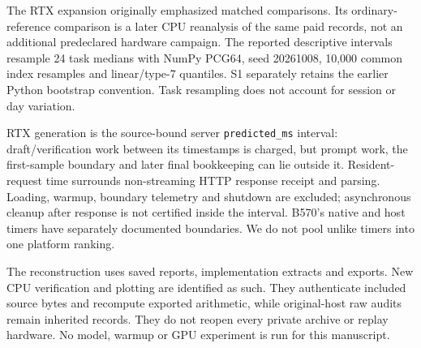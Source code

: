 The RTX expansion originally emphasized matched comparisons. Its ordinary-reference comparison is a later CPU reanalysis of the same paid records, not an additional predeclared hardware campaign. The reported descriptive intervals resample 24 task medians with NumPy PCG64, seed 20261008, 10,000 common index resamples and linear/type-7 quantiles. S1 separately retains the earlier Python bootstrap convention. Task resampling does not account for session or day variation.

RTX generation is the source-bound server \texttt{predicted\_ms} interval: draft/verification work between its timestamps is charged, but prompt work, the first-sample boundary and later final bookkeeping can lie outside it. Resident-request time surrounds non-streaming HTTP response receipt and parsing. Loading, warmup, boundary telemetry and shutdown are excluded; asynchronous cleanup after response is not certified inside the interval. B570's native and host timers have separately documented boundaries. We do not pool unlike timers into one platform ranking.

The reconstruction uses saved reports, implementation extracts and exports. New CPU verification and plotting are identified as such. They authenticate included source bytes and recompute exported arithmetic, while original-host raw audits remain inherited records. They do not reopen every private archive or replay hardware. No model, warmup or GPU experiment is run for this manuscript.
